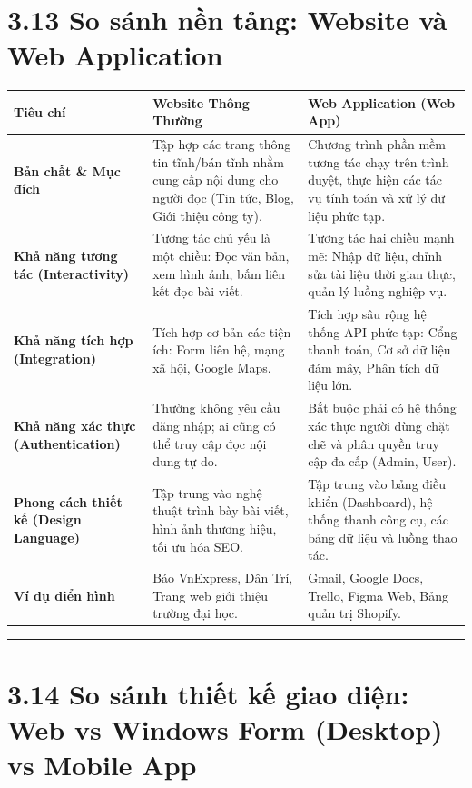 \documentclass[11pt,a4paper,oneside]{report}
\begin{document}
\section{3.13 So sánh nền tảng: Website và Web Application}

\begin{table}[htbp]
\centering
\begin{tabularx}{\textwidth}{p{} p{} p{}}
\toprule
\textbf{Tiêu chí} & \textbf{Website Thông Thường} & \textbf{Web Application (Web App)} \\
\midrule
\textbf{Bản chất \& Mục đích} & Tập hợp các trang thông tin tĩnh/bán tĩnh nhằm cung cấp nội dung cho người đọc (Tin tức, Blog, Giới thiệu công ty). & Chương trình phần mềm tương tác chạy trên trình duyệt, thực hiện các tác vụ tính toán và xử lý dữ liệu phức tạp. \\
\textbf{Khả năng tương tác (Interactivity)} & Tương tác chủ yếu là một chiều: Đọc văn bản, xem hình ảnh, bấm liên kết đọc bài viết. & Tương tác hai chiều mạnh mẽ: Nhập dữ liệu, chỉnh sửa tài liệu thời gian thực, quản lý luồng nghiệp vụ. \\
\textbf{Khả năng tích hợp (Integration)} & Tích hợp cơ bản các tiện ích: Form liên hệ, mạng xã hội, Google Maps. & Tích hợp sâu rộng hệ thống API phức tạp: Cổng thanh toán, Cơ sở dữ liệu đám mây, Phân tích dữ liệu lớn. \\
\textbf{Khả năng xác thực (Authentication)} & Thường không yêu cầu đăng nhập; ai cũng có thể truy cập đọc nội dung tự do. & Bắt buộc phải có hệ thống xác thực người dùng chặt chẽ và phân quyền truy cập đa cấp (Admin, User). \\
\textbf{Phong cách thiết kế (Design Language)} & Tập trung vào nghệ thuật trình bày bài viết, hình ảnh thương hiệu, tối ưu hóa SEO. & Tập trung vào bảng điều khiển (Dashboard), hệ thống thanh công cụ, các bảng dữ liệu và luồng thao tác. \\
\textbf{Ví dụ điển hình} & Báo VnExpress, Dân Trí, Trang web giới thiệu trường đại học. & Gmail, Google Docs, Trello, Figma Web, Bảng quản trị Shopify. \\
\bottomrule
\end{tabularx}
\end{table}

\bigskip\hrule\bigskip

\section{3.14 So sánh thiết kế giao diện: Web vs Windows Form (Desktop) vs Mobile App}
\end{document}

